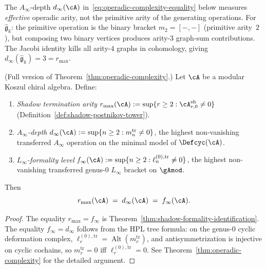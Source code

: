 \begin{remark}
\label{rem:effective-vs-primitive-arity}
The $A_\infty$-depth $d_\infty(\cA)$
in~\eqref{eq:operadic-complexity-equality} below
measures \emph{effective} operadic arity, not the
primitive arity of the generating operations.
For $\hat{\mathfrak{g}}_k$: the primitive operation is
the binary bracket $m_2 = [-,-]$ (primitive arity~$2$),
but composing two binary vertices produces arity-$3$
graph-sum contributions.  The Jacobi identity kills
all arity-$4$ graphs in cohomology, giving
$d_\infty(\hat{\mathfrak{g}}_k) = 3 = r_{\max}$.
\end{remark}

\begin{theorem}
\label{conj:operadic-complexity-detailed}%
\label{thm:operadic-complexity-detailed}%
\ClaimStatusProvedHere
{}
\textup{(}Full version of
Theorem~\textup{\ref{thm:operadic-complexity}}.\textup{)}
Let $\cA$ be a modular Koszul chiral algebra.  Define:
\begin{enumerate}[label=\textup{(\arabic*)}]
\item \emph{Shadow termination arity}\;
  $r_{\max}(\cA) := \sup\{r \geq 2 :
  \cA^{\mathrm{sh}}_{r,0} \neq 0\}$
  \textup{(}Definition~\textup{\ref{def:shadow-postnikov-tower})}.
\item \emph{$A_\infty$-depth}\;
  $d_\infty(\cA) := \sup\{n \geq 2 :
  m_n^{\mathrm{tr}} \neq 0\}$,
  the highest non-vanishing transferred $A_\infty$
  operation on the minimal model of $\Defcyc(\cA)$.
\item \emph{$L_\infty$-formality level}\;
  $f_\infty(\cA) := \sup\{n \geq 2 :
  \ell_n^{(0),\mathrm{tr}} \neq 0\}$,
  the highest non-vanishing transferred genus-$0$
  $L_\infty$ bracket on $\gAmod$.
\end{enumerate}
Then
\begin{equation}
\label{eq:operadic-complexity-equality}
r_{\max}(\cA)
\;=\;
d_\infty(\cA)
\;=\;
f_\infty(\cA).
\end{equation}
\end{theorem}

\begin{proof}
The equality $r_{\max} = f_\infty$ is
Theorem~\ref{thm:shadow-formality-identification}.
The equality $f_\infty = d_\infty$ follows from the
HPL tree formula: on the genus-$0$ cyclic deformation
complex, $\ell_r^{(0),\mathrm{tr}} =
\operatorname{Alt}(m_r^{\mathrm{tr}})$, and
antisymmetrization is injective on cyclic cochains, so
$m_r^{\mathrm{tr}} = 0$ iff
$\ell_r^{(0),\mathrm{tr}} = 0$.
See Theorem~\ref{thm:operadic-complexity} for the
detailed argument.
\end{proof}

